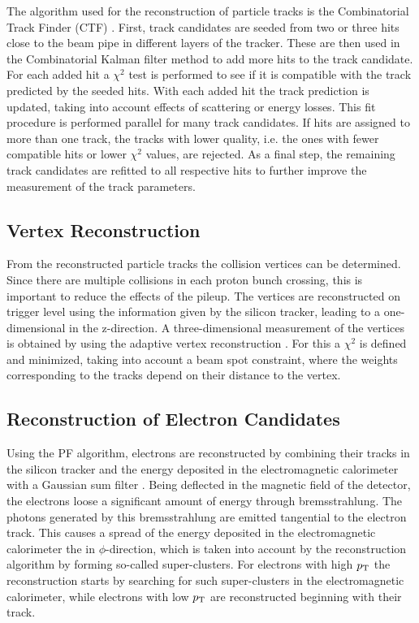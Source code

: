 \noindent The algorithm used for the reconstruction of particle tracks is the Combinatorial Track Finder (CTF) \cite{ctf1,ctf2}. First, track candidates are seeded from two or three hits close to the beam pipe in different layers of the tracker. These are then used in the Combinatorial Kalman filter method \cite{kalman} to add more hits to the track candidate. For each added hit a $\chi^2$ test is performed to see if it is compatible with the track predicted by the seeded hits. With each added hit the track prediction is updated, taking into account effects of scattering or energy losses. This fit procedure is performed parallel for many track candidates. If hits are assigned to more than one track, the tracks with lower quality, i.e. the ones with fewer compatible hits or lower $\chi^2$ values, are rejected. As a final step, the remaining track candidates are refitted to all respective hits to further improve the measurement of the track parameters.

\subsection{Vertex Reconstruction}
From the reconstructed particle tracks the collision vertices can be determined. Since there are multiple collisions in each proton bunch crossing, this is important to reduce the effects of the pileup. The vertices are reconstructed on trigger level using the information given by the silicon tracker, leading to a one-dimensional in the z-direction. A three-dimensional measurement of the vertices is obtained by using the adaptive vertex reconstruction \cite{vertexreco}. For this a $\chi^2$ is defined and minimized, taking into account a beam spot constraint, where the weights corresponding to the tracks depend on their distance to the vertex.
\subsection{Reconstruction of Electron Candidates}
Using the PF algorithm, electrons are reconstructed by combining their tracks in the silicon tracker and the energy deposited in the electromagnetic calorimeter with a Gaussian sum filter \cite{elreco1,elreco2}. Being deflected in the magnetic field of the detector, the electrons loose a significant amount of energy through bremsstrahlung. The photons generated by this bremsstrahlung are emitted tangential to the electron track. This causes a spread of the energy deposited in the electromagnetic calorimeter the in $\phi$-direction, which is taken into account by the reconstruction algorithm by forming so-called super-clusters. For electrons with high $p_{\rm T}$ the reconstruction starts by searching for such super-clusters in the electromagnetic calorimeter, while electrons with low $p_{\rm T}$ are reconstructed beginning with their track.\\

